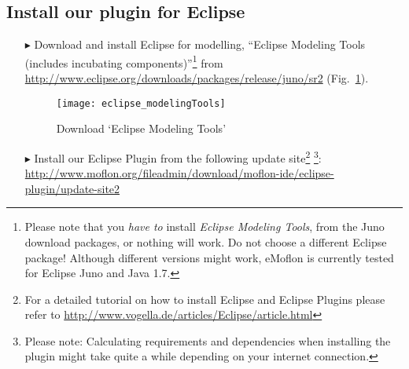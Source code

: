 \newpage
\genHeader
{}

\subsection{Install our plugin for Eclipse}
 
 \vspace{0.5cm}
 
\begin{itemize}
\item[$\blacktriangleright$] Download\hypertarget{installPlugin common}{} and install Eclipse for modelling, ``Eclipse Modeling Tools (includes incubating
components)''\footnote{Please note that you \emph{have to} install \emph{Eclipse Modeling Tools}, from the Juno download packages, or nothing will work.  Do not
choose a different Eclipse package!  Although different versions might work, eMoflon is currently tested for Eclipse Juno and Java 1.7.} from
\url{http://www.eclipse.org/downloads/packages/release/juno/sr2} (Fig.~\ref{fig_downloadModelingPackage}).

\vspace{1.5cm}

\begin{figure}[htbp]
	\centering
  	\texttt{[image: eclipse\_modelingTools]}
	\caption{Download `Eclipse Modeling Tools'}
	\label{fig_downloadModelingPackage}
\end{figure}

\vspace{1cm}

\item[$\blacktriangleright$] Install our Eclipse Plugin from the following update site\footnote{For a detailed tutorial on how to install Eclipse and Eclipse
Plugins please refer to \url{http://www.vogella.de/articles/Eclipse/article.html}} \footnote{Please note: Calculating requirements and dependencies when
installing the plugin might take quite a while depending on your internet connection.}:
\url{http://www.moflon.org/fileadmin/download/moflon-ide/eclipse-plugin/update-site2}

\end{itemize}
